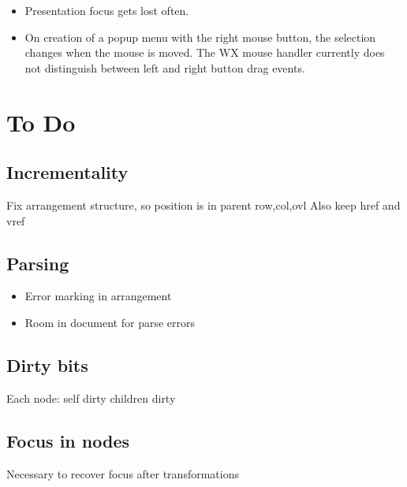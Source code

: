 \documentclass[]{article}
\begin{document}
\begin{itemize}
\item Presentation focus gets lost often.
\item On creation of a popup menu with the right mouse button, the selection changes when the mouse is moved. The WX mouse handler currently does not distinguish between left and right button drag events.
\end{itemize}


\section{To Do}
\subsection{Incrementality}
Fix arrangement structure, so position is in parent row,col,ovl
Also keep href and vref
\subsection{Parsing}
\begin{itemize}
\item Error marking in arrangement
\item Room in document for parse errors
\end{itemize}
\subsection{Dirty bits}
Each node: self dirty children dirty


\subsection{Focus in nodes}
Necessary to recover focus after transformations
\end{document}
